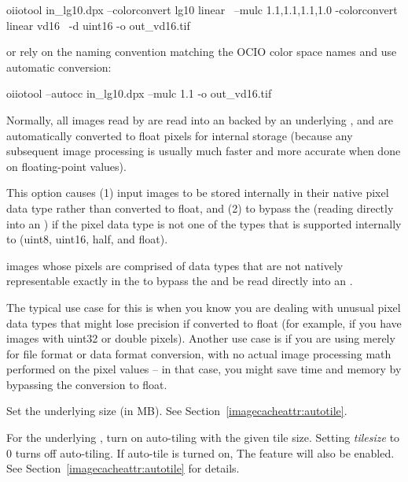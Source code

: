 \begin{code}
  oiiotool in_lg10.dpx --colorconvert lg10 linear \
                       --mulc 1.1,1.1,1.1,1.0 -colorconvert linear vd16 \
                       -d uint16 -o out_vd16.tif
\end{code}

\noindent or rely on the naming convention matching the OCIO color space
names and use automatic conversion:

\begin{code}
  oiiotool --autocc in_lg10.dpx --mulc 1.1 -o out_vd16.tif
\end{code}

\apiend

Normally, all images read by \oiiotool are read into an \ImageBuf backed by
an underlying \ImageCache, and are automatically converted to {\cf float}
pixels for internal storage (because any subsequent image processing is
usually much faster and more accurate when done on floating-point values).

This option causes (1) input images to be stored internally in their native
pixel data type rather than converted to float, and (2) to bypass the
\ImageCache (reading directly into an \ImageBuf) if the pixel data type is
not one of the types that is supported internally to \ImageCache ({\cf uint8},
{\cf uint16}, {\cf half}, and {\cf float}).

images whose pixels are comprised of data types that
are not natively representable exactly in the \ImageCache to bypass the
\ImageCache and be read directly into an \ImageBuf.

The typical use case for this is when you know you are dealing with unusual
pixel data types that might lose precision if converted to {\cf float} (for
example, if you have images with {\cf uint32} or {\cf double} pixels).
Another use case is if you are using \oiiotool merely for file format or
data format conversion, with no actual image processing math performed on
the pixel values -- in that case, you might save time and memory by
bypassing the conversion to {\cf float}.
\apiend

Set the underlying \ImageCache size (in MB). See Section~\ref{imagecacheattr:autotile}.
\apiend

For the underlying \ImageCache, turn on auto-tiling with the given tile
size. Setting \emph{tilesize} to 0 turns off auto-tiling. If auto-tile
is turned on, The \ImageCache \qkw{autoscanline} feature will also be enabled.
See Section~\ref{imagecacheattr:autotile} for details.
\apiend

